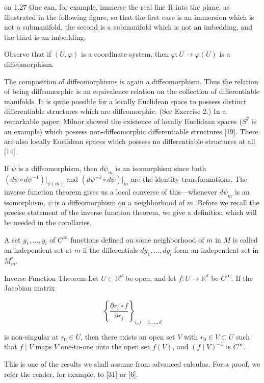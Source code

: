 \begin{remarks}{on 1.27}\label{thm:1.28}
	One can, for example, immerse the real line R into the plane, as illustrated in the following figure, so that the first case is an immersion which is not a submanifold, the second is a submanifold which is not an imbedding, and the third is an imbedding.

	\begin{center}
	\end{center}


	Observe that if $(U,\varphi)$ is a coordinate system, then $\varphi\colon U\to\varphi(U)$ is a diffeomorphism.

	The composition of diffeomorphisms is again a diffeomorphism. Thus the relation of being diffeomorphic is an equivalence relation on the collection of differentiable manifolds. It is quite possible for a locally Euclidean space to possess distinct differentiable structures which are diffeomorphic. (See Exercise 2.) In a remarkable paper, Milnor showed the existence of locally Euclidean spaces ($S^{7}$ is an example) which possess non-diffeomorphic differentiable structures [19]. There are also locally Euclidean spaces which possess no differentiable structures at all [14].

	If $\psi$ is a diffeomorphism, then $d\psi_m$ is an isomorphism since both $(d\psi \circ d\psi^{-1})|_{\psi(m)}$ and $(d\psi^{-1} \circ d\psi)|_m$ are the identity transformations. The inverse function theorem gives us a local converse of this—whenever $d\psi_m$ is an isomorphism, $\psi$ is a diffeomorphism on a neighborhood of $m$. Before we recall the precise statement of the inverse function theorem, we give a definition which will be needed in the corollaries.

\end{remarks}

\begin{definition}\label{thm:1.29}
	A set $y_{1}, \ldots, y_{l}$ of $C^{\infty}$ functions defined on some neighborhood of $m$ in $M$ is called an independent set at $m$ if the differentials $dy_{1}, \ldots, dy_{l}$ form an independent set in $M_{m}^{*}$.
\end{definition}

\begin{theorem}{Inverse Function Theorem}\label{thm:1.30}
	Let  $ U \subset \mathbb{R}^d $ be open, and let  $ f: U \to \mathbb{R}^d $ be  $ C^\infty $. If the Jacobian matrix

	\[
		\left\{\frac{\partial r_{i}\circ f}{\partial r_{j}}\right\}_{i,j=1,\ldots,d}
	\]

	is non-singular at  $ r_0 \in U $, then there exists an open set  $ V $ with  $ r_0 \in V \subset U $ such that  $ f \mid V $ maps  $ V $ one-to-one onto the open set  $ f(V) $, and  $ (f \mid V)^{-1} $ is  $ C^\infty $.

	This is one of the results we shall assume from advanced calculus. For a proof, we refer the reader, for example, to [31] or [6].
\end{theorem}

